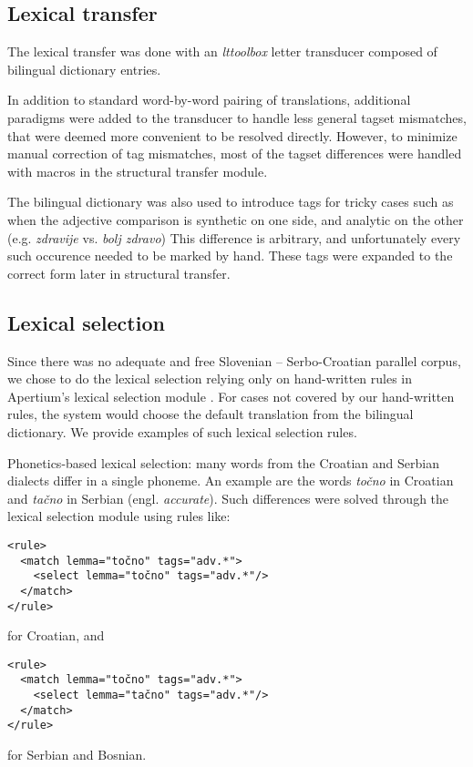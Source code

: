 \subsection{Lexical transfer}
The lexical transfer was done with an \emph{lttoolbox} letter
transducer composed of bilingual dictionary entries.

In addition to standard word-by-word pairing of translations,
additional paradigms were added to the transducer to handle
less general tagset mismatches, that were deemed more convenient to
be resolved directly.
However, to minimize manual correction of tag mismatches, most of the
tagset differences were handled with macros in the structural transfer
module.

The bilingual dictionary was also used to introduce tags for
tricky cases such as when the adjective comparison is synthetic on one
side, and analytic on the other (e.g. \emph{zdravije} vs. \emph{bolj zdravo})
This difference is arbitrary, and unfortunately every such occurence
needed to be marked by hand. These tags were expanded to the correct
form later in structural transfer.

\subsection{Lexical selection}

Since there was no adequate and free Slovenian -- Serbo-Croatian parallel corpus, 
we chose to do the lexical selection relying only on hand-written rules in 
Apertium's lexical selection module \cite{tyers12a}.
For cases not covered by our hand-written rules, the system would choose the 
default translation from the bilingual dictionary.
We provide examples of such lexical selection rules.

Phonetics-based lexical selection: many words from the Croatian and Serbian dialects differ in a single phoneme.
An example are the words \emph{točno} in Croatian and \emph{tačno} in Serbian (engl. \emph{accurate}).
Such differences were solved through the lexical selection module using rules like:

{\small
\begin{Verbatim}
<rule>
  <match lemma="točno" tags="adv.*">
    <select lemma="točno" tags="adv.*"/>
  </match>
</rule>
\end{Verbatim}
}
for Croatian, and
{\small
\begin{Verbatim}
<rule>
  <match lemma="točno" tags="adv.*">
    <select lemma="tačno" tags="adv.*"/>
  </match>
</rule>
\end{Verbatim}
}
for Serbian and Bosnian.

